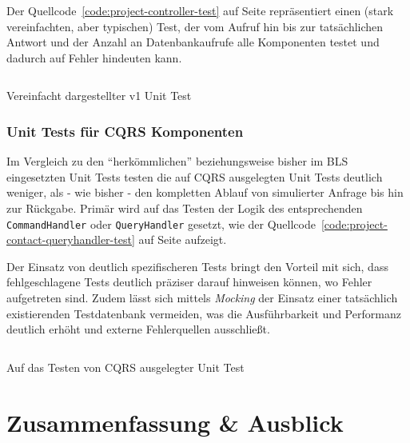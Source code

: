 \documentclass[a4paper,12pt,twoside]{scrreprt}
\begin{document}
Der Quellcode~\ref{code:project-controller-test} auf Seite \pageref{code:project-controller-test} repräsentiert einen (stark vereinfachten, aber typischen) Test, der vom Aufruf hin bis zur tatsächlichen Antwort und der Anzahl an Datenbankaufrufe alle Komponenten testet und dadurch auf Fehler hindeuten kann.

\begin{listing}[ht]
    \inputminted[fontsize=\footnotesize,linenos,breaklines]{php}{code/project_controller_test.php}
    \caption[Vereinfacht dargestellter v1 Unit Test]{Vereinfacht dargestellter v1 Unit Test}
    \label{code:project-controller-test}
\end{listing}

\subsection{Unit Tests für CQRS Komponenten}
\label{sub-sec:v2-unit-tests}
Im Vergleich zu den \enquote{herkömmlichen} beziehungsweise bisher im BLS eingesetzten Unit Tests testen die auf CQRS ausgelegten Unit Tests deutlich weniger, als - wie bisher - den kompletten Ablauf von simulierter Anfrage bis hin zur Rückgabe. Primär wird auf das Testen der Logik des entsprechenden \texttt{CommandHandler} oder \texttt{QueryHandler} gesetzt, wie der Quellcode~\ref{code:project-contact-queryhandler-test} auf Seite \pageref{code:project-contact-queryhandler-test} aufzeigt.

\medskip

Der Einsatz von deutlich spezifischeren Tests bringt den Vorteil mit sich, dass fehlgeschlagene Tests deutlich präziser darauf hinweisen können, wo Fehler aufgetreten sind. Zudem lässt sich mittels \textit{Mocking} der Einsatz einer tatsächlich existierenden Testdatenbank vermeiden, was die Ausführbarkeit und Performanz deutlich erhöht und externe Fehlerquellen ausschließt.

\begin{listing}[ht]
    \inputminted[fontsize=\footnotesize,linenos,breaklines]{php}{code/project_contact_queryhandler_test.php}
    \caption[Auf das Testen von CQRS ausgelegter Unit Test]{Auf das Testen von CQRS ausgelegter Unit Test}
    \label{code:project-contact-queryhandler-test}
\end{listing}

\clearpage

\chapter{Zusammenfassung \& Ausblick}
\label{chap:zusammenfassung-ausblick}
\end{document}
